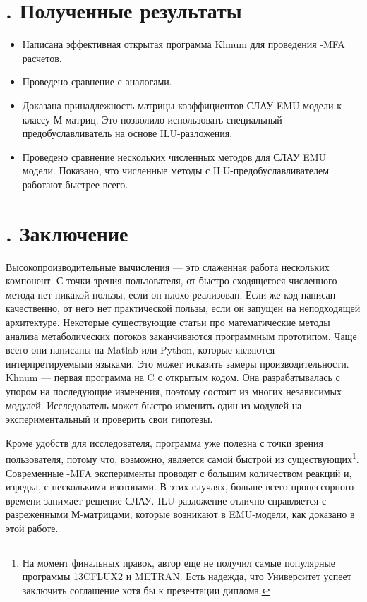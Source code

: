 \documentclass[14pt, a4paper]{extreport}
\newcommand{\CC}{C\nolinebreak\hspace{-.05em}\raisebox{.4ex}{\tiny\bf +}\nolinebreak\hspace{-.10em}\raisebox{.4ex}{\tiny\bf +}}
\def\CC{{C\nolinebreak[4]\hspace{-.05em}\raisebox{.4ex}{\tiny\bf ++}}} %
\begin{document}
\chapter[Полученные результаты]{\thechapter{}. Полученные результаты}
\begin{itemize}
	\item Написана эффективная открытая программа Khnum для проведения -MFA расчетов.
	\item Проведено сравнение с аналогами.
	\item Доказана принадлежность матрицы коэффициентов СЛАУ EMU модели к классу М-матриц. Это позволило использовать специальный предобуславливатель на основе ILU-разложения.
	\item Проведено сравнение нескольких численных методов для СЛАУ EMU модели. Показано, что численные методы с ILU-предобуславливателем работают быстрее всего.
\end{itemize}


\chapter[Заключение]{\thechapter{}. Заключение}
Высокопроизводительные вычисления --- это слаженная работа нескольких компонент. С точки зрения пользователя, от быстро сходящегося численного метода нет никакой пользы, если он плохо реализован. Если же код написан качественно, от него нет практической пользы, если он запущен на неподходящей архитектуре. Некоторые существующие статьи про математические методы анализа метаболических потоков заканчиваются программным прототипом\cite{adjoint_approach, bayesian_3, p13CMFA}. Чаще всего они написаны на Matlab или Python, которые являются интерпретируемыми языками. Это может исказить замеры производительности. Khnum --- первая программа на \CC{} с открытым кодом. Она разрабатывалась с упором на последующие изменения, поэтому состоит из многих независимых модулей. Исследователь может быстро изменить один из модулей на экспериментальный и проверить свои гипотезы. 

Кроме удобств для исследователя, программа уже полезна с точки зрения пользователя, потому что, возможно, является самой быстрой из существующих\footnote{На момент финальных правок, автор еще не получил самые популярные программы 13CFLUX2 и METRAN. Есть надежда, что Университет успеет заключить соглашение хотя бы к презентации диплома.}. Современные -MFA эксперименты проводят с большим количеством реакций и, изредка, с несколькими изотопами. В этих случаях, больше всего процессорного времени занимает решение СЛАУ. ILU-разложение отлично справляется с разреженными М-матрицами, которые возникают в EMU-модели, как доказано в этой работе.
 
\end{document}
